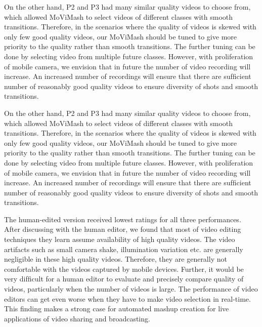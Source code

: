 \documentclass{sig-alternate}
\begin{document}
On the other hand, P2 and P3 had many similar quality videos to choose from, which allowed MoViMash to select videos of different classes with smooth transitions. Therefore, in the scenarios where the quality of videos is skewed with only few good quality videos, our MoViMash should be tuned to give more priority to the quality rather than smooth transitions. The further tuning can be done by selecting video from multiple future classes. However, with proliferation of mobile camera, we envision that in future the number of video recording will increase. An increased number of recordings will ensure that there are sufﬁcient number of reasonably good quality videos to ensure diversity of shots and smooth transitions. 

On the other hand, P2 and P3 had many similar quality videos to choose from, which allowed MoViMash to select videos of different classes with smooth transitions. Therefore, in the scenarios where the quality of videos is skewed with only few good quality videos, our MoViMash should be tuned to give more priority to the quality rather than smooth transitions. The further tuning can be done by selecting video from multiple future classes. However, with proliferation of mobile camera, we envision that in future the number of video recording will increase. An increased number of recordings will ensure that there are sufﬁcient number of reasonably good quality videos to ensure diversity of shots and smooth transitions. 

The human-edited version received lowest ratings for all three performances. After discussing with the human editor, we found that most of video editing techniques they learn assume availability of high quality videos. The video artifacts such as small camera shake, illumination variation etc. are generally negligible in these high quality videos. Therefore, they are generally not comfortable with the videos captured by mobile devices. Further, it would be very difﬁcult for a human editor to evaluate and precisely compare quality of videos, particularly when the number of videos is large. The performance of video editors can get even worse when they have to make video selection in real-time. This ﬁnding makes a strong case for automated mashup creation for live applications of video sharing and broadcasting. 
\end{document}
